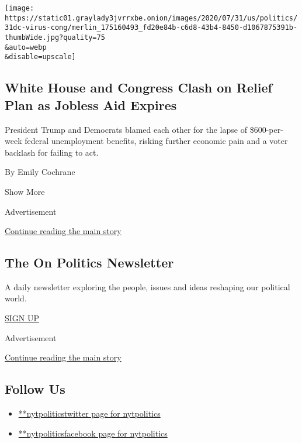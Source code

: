 \begin{enumerate}
  \texttt{[image: https://static01.graylady3jvrrxbe.onion/images/2020/07/31/us/politics/31dc-virus-cong/merlin\_175160493\_fd20e84b-c6d8-43b4-8450-d1067875391b-thumbWide.jpg?quality=75\\\&auto=webp\\\&disable=upscale]}

  \hypertarget{white-house-and-congress-clash-on-relief-plan-as-jobless-aid-expires}{%
  \subsection{White House and Congress Clash on Relief Plan as Jobless
  Aid
  Expires}\label{white-house-and-congress-clash-on-relief-plan-as-jobless-aid-expires}}

  President Trump and Democrats blamed each other for the lapse of
  \$600-per-week federal unemployment benefits, risking further economic
  pain and a voter backlash for failing to act.

  By Emily Cochrane
\end{enumerate}

Show More

Advertisement

\protect\hyperlink{after-mid2}{Continue reading the main story}

\hypertarget{the-on-politics-newsletter}{%
\subsection{The On Politics
Newsletter}\label{the-on-politics-newsletter}}

A daily newsletter exploring the people, issues and ideas reshaping our
political world.

\href{/newsletters/signup/CN}{SIGN UP}

Advertisement

\protect\hyperlink{after-mktg}{Continue reading the main story}

\hypertarget{follow-us}{%
\subsection{Follow Us}\label{follow-us}}

\begin{itemize}
\tightlist
\item
  \href{https://twitter.com/nytpolitics}{**nytpoliticstwitter page for
  nytpolitics}
\item
  \href{https://www.facebookcorewwwi.onion/nytpolitics}{**nytpoliticsfacebook
  page for nytpolitics}
\end{itemize}


